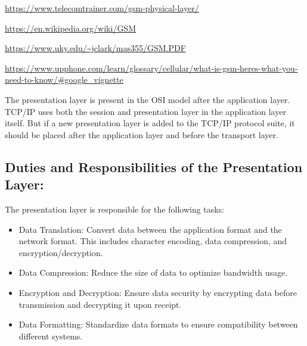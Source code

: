 \documentclass[a4paper]{exam}
\begin{document}
\begin{questions}
\begin{solution}
\begin{thebibliography}{9}
            \url{https://www.telecomtrainer.com/gsm-physical-layer/}

            \url{https://en.wikipedia.org/wiki/GSM}

            \url{https://www.uky.edu/~jclark/mas355/GSM.PDF}

            \url{https://www.upphone.com/learn/glossary/cellular/what-is-gsm-heres-what-you-need-to-know/#google_vignette}
        \end{thebibliography}
        \end{solution}

        \begin{solution}
            The presentation layer is present in the OSI model after the application layer. TCP/IP uses both the session and presentation layer in the application layer itself. But if a new presentation layer is added to the TCP/IP protocol suite, it should be placed after the application layer and before the transport layer.
            \subsection*{Duties and Responsibilities of the Presentation Layer:}
                The presentation layer is responsible for the following tasks:
                \begin{itemize}
                    \item Data Translation: Convert data between the application format and the network format. This includes character encoding, data compression, and encryption/decryption.
                    \item Data Compression: Reduce the size of data to optimize bandwidth usage.
                    \item Encryption and Decryption: Ensure data security by encrypting data before transmission and decrypting it upon receipt.
                    \item Data Formatting: Standardize data formats to ensure compatibility between different systems.
                \end{itemize}

\end{solution}
\end{questions}
\end{document}
